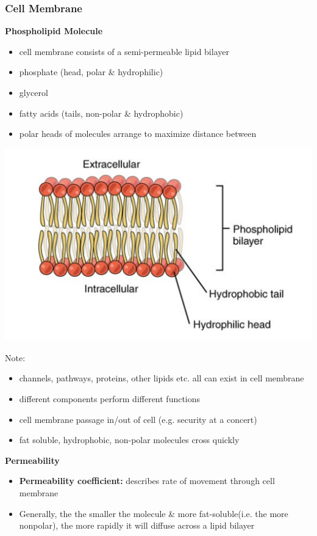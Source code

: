 \documentclass[11pt,fleqn]{book}
\begin{document}
\subsubsection{Cell Membrane}
\textbf{Phospholipid Molecule}
\begin{itemize}
    \item cell membrane consists of a semi-permeable lipid bilayer
    \item phosphate (head, polar \& hydrophilic)
    \item glycerol
    \item fatty acids (tails, non-polar \& hydrophobic)
    \item polar heads of molecules arrange to maximize distance between
\end{itemize}
\begin{center}
    \includegraphics[width=0.65\linewidth]{Pictures/Screenshot 2024-02-25 205202.png}
\end{center}
Note:
\begin{itemize}
    \item channels, pathways, proteins, other lipids etc. all can exist in cell membrane
    \item different components perform different functions
    \item cell membrane passage in/out of cell (e.g. security at a concert)
    \item fat soluble, hydrophobic, non-polar molecules cross quickly
\end{itemize}
\textbf{Permeability}
\begin{itemize}
    \item \textbf{Permeability coefficient:} describes rate of movement through cell membrane
    \item Generally, the the smaller the molecule \& more fat-soluble(i.e. the more nonpolar), the more rapidly it will diffuse across a lipid bilayer
\end{itemize}
\end{document}
